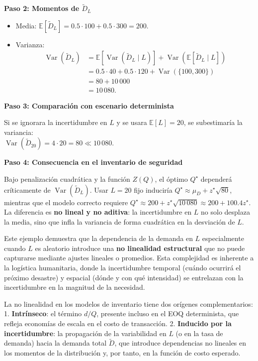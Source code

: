 \documentclass[
  spanish,
  us-letterpaper,
  DIV=11,
  numbers=noendperiod]{scrreprt}
\providecommand{\tightlist}{%
  \setlength{\itemsep}{0pt}\setlength{\parskip}{0pt}}
\numberwithin{equation}{section}
\begin{document}
\textbf{Paso 2: Momentos de \(\tilde{D}_L\)}

\begin{itemize}
\tightlist
\item
  Media:
  \(\mathbb{E}[\tilde{D}_L] = 0.5 \cdot 100 + 0.5 \cdot 300 = 200\).
\item
  Varianza:\\
  \[
  \begin{aligned}
  \operatorname{Var}(\tilde{D}_L) 
  &= \mathbb{E}[\operatorname{Var}(\tilde{D}_L \mid L)] 
   + \operatorname{Var}(\mathbb{E}[\tilde{D}_L \mid L]) \\[4pt]
  &= 0.5 \cdot 40 + 0.5 \cdot 120 
   + \operatorname{Var}(\{100, 300\}) \\[4pt]
  &= 80 + 10\,000 \\[4pt]
  &= 10\,080.
  \end{aligned}
  \]
\end{itemize}

\textbf{Paso 3: Comparación con escenario determinista}

Si se ignorara la incertidumbre en \(L\) y se usara
\(\mathbb{E}[L] = 20\), se subestimaría la variancia:\\
\(\operatorname{Var}(\tilde{D}_{20}) = 4 \cdot 20 = 80 \ll 10\,080\).

\textbf{Paso 4: Consecuencia en el inventario de seguridad}

Bajo penalización cuadrática y la función \(Z(Q)\), el óptimo
\(Q^\star\) dependerá críticamente de
\(\operatorname{Var}(\tilde{D}_L)\). Usar \(L = 20\) fijo induciría
\(Q^\star \approx \mu_D + z^\star \sqrt{80}\), mientras que el modelo
correcto requiere
\(Q^\star \approx 200 + z^\star \sqrt{10\,080} \approx 200 + 100.4 z^\star\).
La diferencia es \textbf{no lineal y no aditiva}: la incertidumbre en
\(L\) no solo desplaza la media, sino que infla la variancia de forma
cuadrática en la desviación de \(L\).

Este ejemplo demuestra que la dependencia de la demanda en \(L\)
especialmente cuando \(L\) es aleatorio introduce una \textbf{no
linealidad estructural} que no puede capturarse mediante ajustes
lineales o promedios. Esta complejidad es inherente a la logística
humanitaria, donde la incertidumbre temporal (cuándo ocurrirá el próximo
desastre) y espacial (dónde y con qué intensidad) se entrelazan con la
incertidumbre en la magnitud de la necesidad.

La no linealidad en los modelos de inventario tiene dos orígenes
complementarios: 1. \textbf{Intrínseco}: el término \(d/Q\), presente
incluso en el EOQ determinista, que refleja economías de escala en el
costo de transacción. 2. \textbf{Inducido por la incertidumbre}: la
propagación de la variabilidad en \(L\) (o en la tasa de demanda) hacia
la demanda total \(\tilde{D}\), que introduce dependencias no lineales
en los momentos de la distribución y, por tanto, en la función de costo
esperado.
\end{document}
